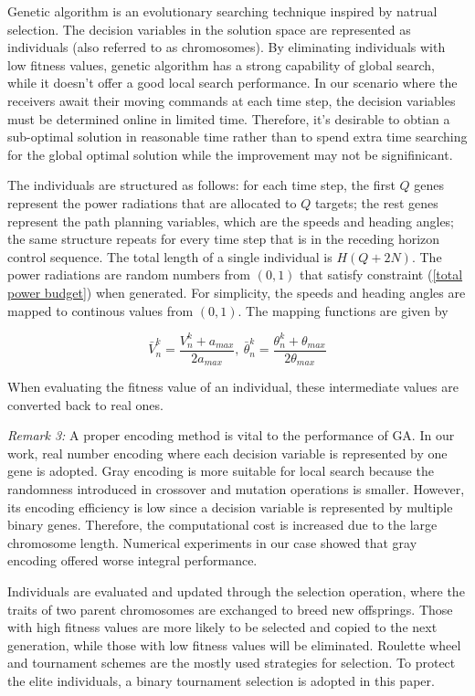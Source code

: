 \documentclass[12pt,journal,draftclsnofoot,onecolumn]{IEEEtran}
\begin{document}
Genetic algorithm is an evolutionary searching technique inspired by natrual selection. The decision variables in the solution space are represented as individuals (also referred to as chromosomes). By eliminating individuals with low fitness values, genetic algorithm has a strong capability of global search, while it doesn't offer a good local search performance. In our scenario where the receivers await their moving commands at each time step, the decision variables must be determined online in limited time. Therefore, it's desirable to obtian a sub-optimal solution in reasonable time rather than to spend extra time searching for the global optimal solution while the improvement may not be signifinicant.

The individuals are structured as follows: for each time step, the first $Q$ genes represent the power radiations that are allocated to $Q$ targets; the rest genes represent the path planning variables, which are the speeds and heading angles; the same structure repeats for every time step that is in the receding horizon control sequence. The total length of a single individual is $H(Q+2N)$. The power radiations are random numbers from $(0,1)$ that satisfy constraint (\ref{total power budget}) when generated. For simplicity, the speeds and heading angles are mapped to continous values from $(0,1)$. The mapping functions are given by 

\begin{equation}
	\bar{V}_n^k=\frac{V_n^k+a_{max}}{2a_{max}}, \  \bar{\theta}_n^k=\frac{\theta_n^k+\theta_{max}}{2\theta_{max}} 
\end{equation}

When evaluating the fitness value of an individual, these intermediate values are converted back to real ones.

\emph{Remark 3:} A proper encoding method is vital to the performance of GA. In our work, real number encoding where each decision variable is represented by one gene is adopted. Gray encoding is more suitable for local search because the randomness introduced in crossover and mutation operations is smaller. However, its encoding efficiency is low since a decision variable is represented by multiple binary genes. Therefore, the computational cost is increased due to the large chromosome length. Numerical experiments in our case showed that gray encoding offered worse integral performance. 

Individuals are evaluated and updated through the selection operation, where the traits of two parent chromosomes are exchanged to breed new offsprings. Those with high fitness values are more likely to be selected and copied to the next generation, while those with low fitness values will be eliminated. Roulette wheel and tournament schemes are the mostly used strategies for selection. To protect the elite individuals, a binary tournament selection is adopted in this paper. 
\end{document}
